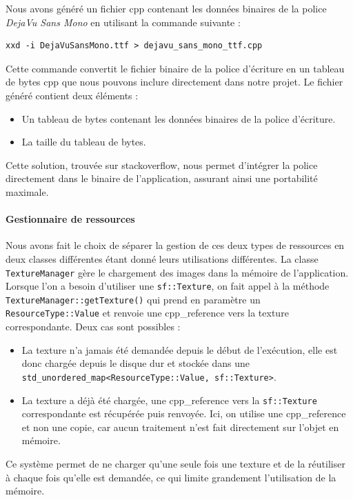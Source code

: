 Nous avons généré un fichier \gls{cpp} contenant les données binaires de la police \textit{DejaVu Sans Mono} en utilisant la commande suivante :
\begin{lstlisting}[style=BashStyle,label={lst:generation_dejavusansmonottf_h}]
xxd -i DejaVuSansMono.ttf > dejavu_sans_mono_ttf.cpp
\end{lstlisting}
Cette commande convertit le fichier binaire de la police d'écriture en un tableau de bytes \gls{cpp} que nous pouvons inclure directement dans notre projet.
Le fichier généré contient deux éléments :
\begin{itemize}
    \item Un tableau de bytes contenant les données binaires de la police d'écriture.
    \item La taille du tableau de bytes.
\end{itemize}
Cette solution, trouvée sur \gls{stackoverflow}\cite{stackoverflow_embed_font}, nous permet d'intégrer la police directement dans le binaire de l'application, assurant ainsi une portabilité maximale.

\paragraph{Gestionnaire de ressources}
Nous avons fait le choix de séparer la gestion de ces deux types de ressources en deux classes différentes étant donné leurs utilisations différentes.
La classe \texttt{TextureManager} gère le chargement des images dans la mémoire de l'application.
Lorsque l'on a besoin d'utiliser une \texttt{sf::Texture}\cite{sfml_sf_texture}, on fait appel à la méthode \texttt{TextureManager::getTexture()} qui prend en paramètre un \texttt{ResourceType::Value} et renvoie une \gls{cpp_reference} vers la texture correspondante.
Deux cas sont possibles :
\begin{itemize}
    \item La texture n'a jamais été demandée depuis le début de l'exécution, elle est donc chargée depuis le disque dur et stockée dans une \texttt{\gls{std_unordered_map}<ResourceType::Value, sf::Texture>}\cite{cpp_reference_std_unordered_map}.
    \item La texture a déjà été chargée, une \gls{cpp_reference} vers la \texttt{sf::Texture}\cite{sfml_sf_texture} correspondante est récupérée puis renvoyée.
    Ici, on utilise une \gls{cpp_reference} et non une copie, car aucun traitement n'est fait directement sur l'objet en mémoire.
\end{itemize}
Ce système permet de ne charger qu'une seule fois une texture et de la réutiliser à chaque fois qu'elle est demandée, ce qui limite grandement l'utilisation de la mémoire.


